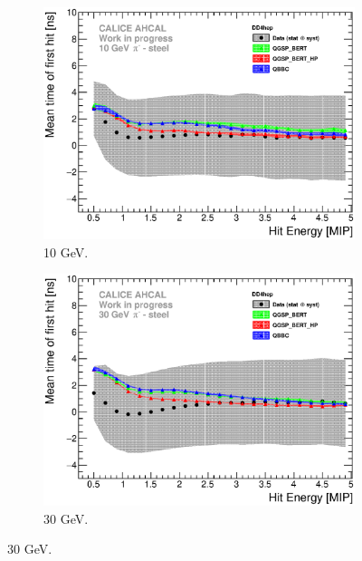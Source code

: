 \begin{figure}[htbp!]
  \begin{subfigure}[t]{0.49\textwidth}
    \centering
    \includegraphics[width=1\textwidth]{../Thesis_Plots/Timing/Pions/Plots/ComparisonToSim/Time_Energy_10GeV_DD4hep.eps}
    \caption{10 GeV.}\label{fig:Energy_SimData_10GeV_DD4hep}
  \end{subfigure}
  \hfill
  \begin{subfigure}[t]{0.49\textwidth}
    \centering
    \includegraphics[width=1\textwidth]{../Thesis_Plots/Timing/Pions/Plots/ComparisonToSim/Time_Energy_30GeV_DD4hep.eps}
    \caption{30 GeV.}\label{fig:Energy_SimData_30GeV_DD4hep}
  \end{subfigure}
  \hfill

\end{figure}
